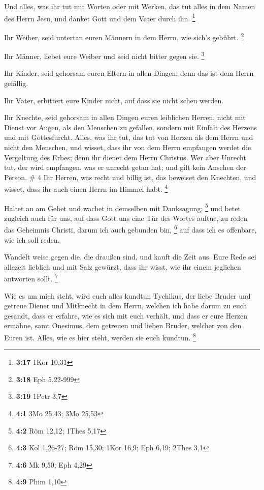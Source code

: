  Und alles, was ihr tut mit Worten oder mit Werken, das tut
alles in dem Namen des Herrn Jesu, und danket Gott und dem Vater durch
ihn. \footnote{\textbf{3:17} 1Kor 10,31}

 Ihr Weiber, seid untertan euren Männern in dem Herrn, wie
sich's gebührt. \footnote{\textbf{3:18} Eph 5,22-999}

 Ihr Männer, liebet eure Weiber und seid nicht bitter gegen
sie. \footnote{\textbf{3:19} 1Petr 3,7}

 Ihr Kinder, seid gehorsam euren Eltern in allen Dingen;
denn das ist dem Herrn gefällig.

 Ihr Väter, erbittert eure Kinder nicht, auf dass sie nicht
scheu werden.

 Ihr Knechte, seid gehorsam in allen Dingen euren
leiblichen Herren, nicht mit Dienst vor Augen, als den Menschen zu
gefallen, sondern mit Einfalt des Herzens und mit Gottesfurcht.
 Alles, was ihr tut, das tut von Herzen als dem Herrn und
nicht den Menschen,  und wisset, dass ihr von dem Herrn
empfangen werdet die Vergeltung des Erbes; denn ihr dienet dem Herrn
Christus.  Wer aber Unrecht tut, der wird empfangen, was er
unrecht getan hat; und gilt kein Ansehen der Person. \# 4 
Ihr Herren, was recht und billig ist, das beweiset den Knechten, und
wisset, dass ihr auch einen Herrn im Himmel habt. \footnote{\textbf{4:1}
  3Mo 25,43; 3Mo 25,53}

 Haltet an am Gebet und wachet in demselben mit Danksagung;
\footnote{\textbf{4:2} Röm 12,12; 1Thes 5,17}  und betet
zugleich auch für uns, auf dass Gott uns eine Tür des Wortes auftue, zu
reden das Geheimnis Christi, darum ich auch gebunden bin, \footnote{\textbf{4:3}
  Kol 1,26-27; Röm 15,30; 1Kor 16,9; Eph 6,19; 2Thes 3,1} 
auf dass ich es offenbare, wie ich soll reden.

 Wandelt weise gegen die, die draußen sind, und kauft die
Zeit aus.  Eure Rede sei allezeit lieblich und mit Salz
gewürzt, dass ihr wisst, wie ihr einem jeglichen antworten sollt.
\footnote{\textbf{4:6} Mk 9,50; Eph 4,29}

 Wie es um mich steht, wird euch alles kundtun Tychikus, der
liebe Bruder und getreue Diener und Mitknecht in dem Herrn, 
welchen ich habe darum zu euch gesandt, dass er erfahre, wie es sich mit
euch verhält, und dass er eure Herzen ermahne,  samt
Onesimus, dem getreuen und lieben Bruder, welcher von den Euren ist.
Alles, wie es hier steht, werden sie euch kundtun. \footnote{\textbf{4:9}
  Phim 1,10}

